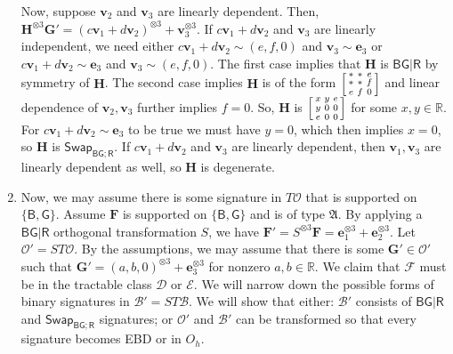 \documentclass[11pt]{article}
\newcommand{\db}{\mathsf{B}}
\newcommand{\dg}{\mathsf{G}}
\newcommand{\dr}{\mathsf{R}}
\newcommand{\swhelper}[1]{$\mathsf{Swap}_{#1}$\xspace}
\newcommand{\swbg}{\swhelper{\db \dg; \dr}}
\newcommand{\octgroup}{O_h}
\newcommand{\teh}{^{\otimes 3}}
\newcommand{\strspt}{\textsf{EBD}\xspace}
\newcommand{\tractBGR}{$\mathscr{D}$\xspace}
\newcommand{\tractBGGRBR}{$\mathscr{E}$\xspace}
\newcommand{\ternarytractgeneq}{$\mathfrak{A}$\xspace}
\begin{document}
\begin{enumerate}
    Now, suppose $\mathbf{v}_2$ and $\mathbf{v}_3$ are linearly dependent.
    Then, $\mathbf{H}\teh \mathbf{G}' = (c \mathbf{v}_1 + d \mathbf{v}_2)\teh + \mathbf{v}_3\teh$.
    If $c \mathbf{v}_1 + d \mathbf{v}_2$ and $\mathbf{v}_3$ are linearly independent, we need either $c \mathbf{v}_1 + d \mathbf{v}_2 \sim (e, f, 0)$ and $\mathbf{v}_3 \sim \mathbf{e}_3$ or $c \mathbf{v}_1 + d \mathbf{v}_2 \sim \mathbf{e}_3$ and $\mathbf{v}_3 \sim (e, f, 0)$.
    The first case implies that $\mathbf{H}$ is $\db \dg | \dr$ by symmetry of $\mathbf{H}$.
    The second case implies $\mathbf{H}$ is of the form $\begin{bsmallmatrix}
      * & * & e \\
      * & * & f \\
      e & f & 0
    \end{bsmallmatrix}$ and linear dependence of $\mathbf{v}_2, \mathbf{v}_3$ further implies $f = 0$.
    So, $\mathbf{H}$ is $\begin{bsmallmatrix}
      x & y & e \\
      y & 0 & 0 \\
      e & 0 & 0
    \end{bsmallmatrix}$ for some $x, y \in \mathbb{R}$.
    For $c \mathbf{v}_1 + d \mathbf{v}_2 \sim \mathbf{e}_3$ to be true we must have $y = 0$, which then implies $x = 0$, so $\mathbf{H}$ is \swbg.
    If $c \mathbf{v}_1 + d \mathbf{v}_2$ and $\mathbf{v}_3$ are linearly dependent, then $\mathbf{v}_1, \mathbf{v}_3$ are linearly dependent as well, so $\mathbf{H}$ is degenerate.
  \item Now, we may assume there is some signature in $T \mathcal{O}$ that is supported on $\{\db, \dg\}$.
    Assume $\mathbf{F}$ is supported on $\{\db, \dg\}$ and is of type \ternarytractgeneq.
    By applying a $\db \dg | \dr$ orthogonal transformation $S$, we have $\mathbf{F}' = S \teh \mathbf{F} = \mathbf{e}_1\teh + \mathbf{e}_2\teh$.
    Let $\mathcal{O}' = S T \mathcal{O}$.
    By the assumptions, we may assume that there is some $\mathbf{G}' \in \mathcal{O}'$ such that $\mathbf{G}' = (a, b, 0)\teh + \mathbf{e}_3\teh$ for nonzero $a, b \in \mathbb{R}$.
    We claim that $\mathcal{F}$ must be in the tractable class \tractBGR or \tractBGGRBR.
We will narrow down the possible forms of binary signatures in $\mathcal{B}' = ST \mathcal{B}$.
    We will show that either: $\mathcal{B}'$ consists of $\db \dg | \dr$ and \swbg signatures; or $\mathcal{O}'$ and $\mathcal{B}'$ can be transformed so that every signature becomes \strspt or in $\octgroup$.


\end{enumerate}
\end{document}
